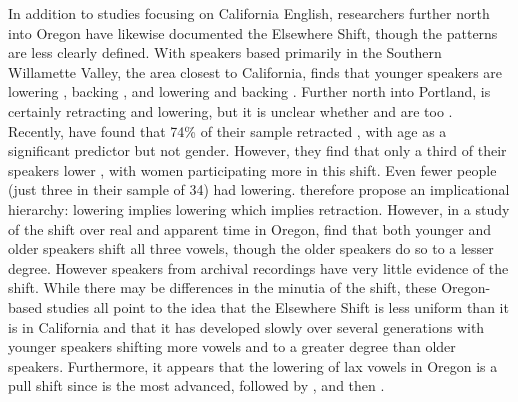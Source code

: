 In addition to studies focusing on California English, researchers further north into Oregon have likewise documented the Elsewhere Shift, though the patterns are less clearly defined. With speakers based primarily in the Southern Willamette Valley, the area closest to California, \citet{nelson_2011} finds that younger speakers are lowering \kit, backing \dress, and lowering and backing \trap. Further north into Portland, \trap is certainly retracting and lowering, but it is unclear whether \dress and \kit are too \citep{conn_2000_diss, becker_etal_2013}. Recently, \citet[116--118]{becker_etal_2016_pads}  have found that 74\% of their sample retracted \trap, with age as a significant predictor but not gender. However, they find that only a third of their speakers lower \dress, with women participating more in this shift. Even fewer people (just three in their sample of 34) had \kit lowering. \citeauthor{becker_etal_2016_pads} therefore propose an implicational hierarchy: \kit lowering implies \dress lowering which implies \trap retraction. However, in a study of the shift over real and apparent time in Oregon, \citet{mclarty_etal_2016} find that both younger and older speakers shift all three vowels, though the older speakers do so to a lesser degree. However speakers from archival recordings have very little evidence of the shift. While there may be differences in the minutia of the shift, these Oregon-based studies all point to the idea that the Elsewhere Shift is less uniform than it is in California and that it has developed slowly over several generations with younger speakers shifting more vowels and to a greater degree than older speakers. Furthermore, it appears that the lowering of lax vowels in Oregon is a pull shift since \trap is the most advanced, followed by \dress, and then \kit.

